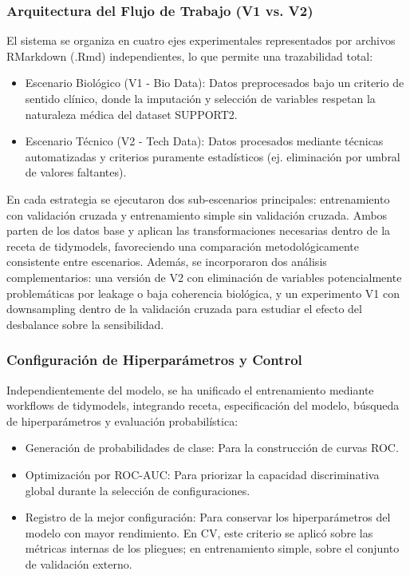 \subsubsection{Arquitectura del Flujo de Trabajo (V1 vs. V2)}

El sistema se organiza en cuatro ejes experimentales representados por archivos
RMarkdown (.Rmd) independientes, lo que permite una trazabilidad total:

\begin{itemize}
  \item Escenario Biológico (V1 - Bio Data): Datos preprocesados bajo un criterio de
    sentido clínico, donde la imputación y selección de variables respetan la
    naturaleza médica del dataset SUPPORT2.
  \item Escenario Técnico (V2 - Tech Data): Datos procesados mediante técnicas
    automatizadas y criterios puramente estadísticos (ej. eliminación por umbral
    de valores faltantes).
\end{itemize}

En cada estrategia se ejecutaron dos sub-escenarios principales: entrenamiento
con validación cruzada y entrenamiento simple sin validación cruzada. Ambos
parten de los datos base y aplican las transformaciones necesarias dentro de la
receta de tidymodels, favoreciendo una comparación metodológicamente consistente
entre escenarios. Además, se incorporaron dos análisis complementarios: una
versión de V2 con eliminación de variables potencialmente problemáticas por
leakage o baja coherencia biológica, y un experimento V1 con downsampling dentro
de la validación cruzada para estudiar el efecto del desbalance sobre la
sensibilidad.

\subsubsection{Configuración de Hiperparámetros y Control}

Independientemente del modelo, se ha unificado el entrenamiento mediante
workflows de tidymodels, integrando receta, especificación del modelo,
búsqueda de hiperparámetros y evaluación probabilística:

\begin{itemize}
  \item Generación de probabilidades de clase: Para la construcción de curvas ROC.
  \item Optimización por ROC-AUC: Para priorizar la capacidad discriminativa global
    durante la selección de configuraciones.
  \item Registro de la mejor configuración: Para conservar los hiperparámetros del
    modelo con mayor rendimiento. En CV, este criterio se aplicó sobre las
    métricas internas de los pliegues; en entrenamiento simple, sobre el conjunto
    de validación externo.
\end{itemize}

